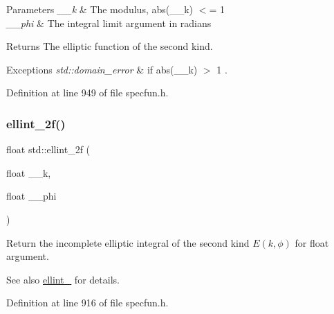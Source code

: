 \begin{DoxyParams}{Parameters}
{\em \+\_\+\+\_\+k} & The modulus, {\ttfamily  abs(\+\_\+\+\_\+k) $<$= 1 } \\
\hline
{\em \+\_\+\+\_\+phi} & The integral limit argument in radians \\
\hline
\end{DoxyParams}
\begin{DoxyReturn}{Returns}
The elliptic function of the second kind. 
\end{DoxyReturn}

\begin{DoxyExceptions}{Exceptions}
{\em std\+::domain\+\_\+error} & if {\ttfamily  abs(\+\_\+\+\_\+k) $>$ 1 }. \\
\hline
\end{DoxyExceptions}


Definition at line 949 of file specfun.\+h.

\mbox{\label{group__tr29124__math__spec__func_ga594a730163c6228c75b152462700062b}} 
\subsubsection{\texorpdfstring{ellint\+\_\+2f()}{ellint\_2f()}}
{\footnotesize\ttfamily float std\+::ellint\+\_\+2f (\begin{DoxyParamCaption}\item[{float}]{\+\_\+\+\_\+k,  }\item[{float}]{\+\_\+\+\_\+phi }\end{DoxyParamCaption})\hspace{0.3cm}{\ttfamily [inline]}}



Return the incomplete elliptic integral of the second kind $ E(k,\phi) $ for {\ttfamily float} argument. 

\begin{DoxySeeAlso}{See also}
\hyperlink{group__tr29124__math__spec__func_gad64cb9babb7837d585912b1a94b2cb7d}{ellint\+\_} for details. 
\end{DoxySeeAlso}


Definition at line 916 of file specfun.\+h.


